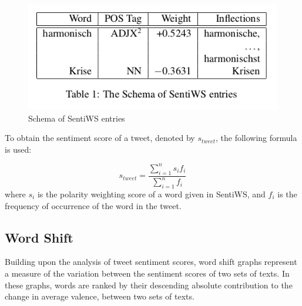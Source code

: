 \documentclass[10pt,twocolumn,twoside]{layout}
\begin{document}
\begin{figure} 
	\begin{center}
		\includegraphics[width=\linewidth]{figures/sentiws_example}
	\end{center}
	\caption{Schema of SentiWS entries}
	\label{fig:sentiws_example}
\end{figure}

To obtain the sentiment score of a tweet, denoted by \(s_{tweet}\), the following formula is used: 

\begin{equation}
\label{eq:word_score}
s_{tweet} = \frac{\sum_{i=1}^{n} s_i f_i}{\sum_{i=1}^{n} f_i}
\end{equation} 
where \(s_i\) is the polarity weighting score of a word given in SentiWS, and \(f_i\) is the frequency of occurrence of the word in the tweet. 

\subsection*{Word Shift}
Building upon the analysis of tweet sentiment scores, word shift graphs represent a measure of the variation between the sentiment scores of two sets of texts. In these graphs, words are ranked by their descending absolute contribution to the change in average valence, between two sets of texts. 
\end{document}

